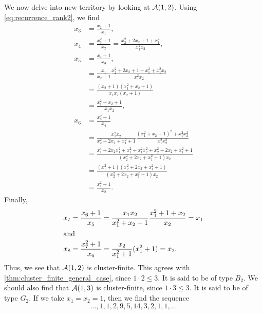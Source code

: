 \begin{example}
	We now delve into new territory by looking at $\mathcal{A}(1,2)$. Using
	\cref{eq:recurrence_rank2}, we find
	\begin{align*}
		x_3 & = \frac{x_2 + 1}{x_1},                                                                                     \\
		x_4 & = \frac{x_3^2 + 1}{x_2} =  \frac{x_2^2 + 2x_2 + 1 + x_1^2}{x_1^2 x_2},                                     \\
		x_5 & = \frac{x_4 + 1}{x_3},                                                                                     \\
		    & = \frac{x_1}{x_2+1}\frac{x_2^2 + 2x_2 +1 + x_1^2 + x_1^2 x_2}{x_1^2 x_2}                                   \\
		    & = \frac{(x_2 +1)(x_1^2 + x_2 + 1)}{x_1 x_2(x_2 + 1)}                                                       \\
		    & = \frac{x_1^2 + x_2 + 1}{x_1x_2},                                                                          \\
		x_6 & = \frac{x_5^2 +1}{x_4}                                                                                     \\
		    & = \frac{x_1^2 x_2}{x_2^2 + 2x_2 + x_1^2 + 1}\frac{(x_1^2 + x_2 + 1)^2 + x_1^2 x_2^2}{x_1^2x_2^2}           \\
		    & = \frac{x_1^4 + 2x_2x_1^2 + x_1^2 + x_1^2 x_2^2+ x_2^2 + 2 x_2 + x_1^2 + 1}{(x_2^2 + 2x_2 + x_1^2 + 1)x_2} \\
		    & = \frac{(x_1^2 + 1)(x_2^2 + 2x_2 + x_1^2 + 1)}{(x_2^2 + 2x_2 + x_1^2 + 1)x_2}                              \\
		    & = \frac{x_1^2 + 1}{x_2}.
	\end{align*}
	Finally,
	\begin{align*}
		x_7 & = \frac{x_6 +1}{x_5} = \frac{x_1x_2}{x_1^2 + x_2 + 1}\frac{x_1^2 +1 + x_2}{x_2} = x_1 \\
		\shortintertext{and}
		x_8 & = \frac{x_7^2 + 1}{x_6} = \frac{x_2}{x_1^2 + 1}(x_1^2 + 1) = x_2.
	\end{align*}
	Thus, we see that $\mathcal{A}(1,2)$ is cluster-finite. This agrees with
	\cref{thm:cluster_finite_general_case}, since $1 \cdot 2 \leq 3$. It is said to be of
	type $B_2$. We should also find that $\mathcal{A}(1,3)$ is cluster-finite, since $1 \cdot 3
		\leq 3$. It is said to be of type $G_2$. If we take $x_1 = x_2 = 1$, then we find the
	sequence
	\begin{equation*}
		\dots, 1, 1, 2, 9, 5, 14, 3, 2, 1, 1, \dots

\end{equation*}
\end{example}
